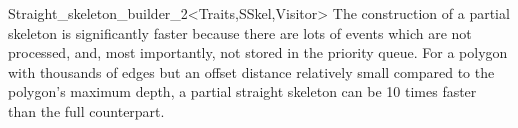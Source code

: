 \begin{ccRefClass}{Straight_skeleton_builder_2<Traits,SSkel,Visitor>}
The construction of a partial skeleton is significantly faster because there are lots of events which are not processed, and, most importantly, not stored in the priority queue.
For a polygon with thousands of edges but an offset distance relatively small compared to the polygon's maximum depth, a partial straight skeleton can be 10 times faster\\
than the full counterpart.



\ccSeeAlso
{}\\
\\
\\
\\
\\
\\
\\
\\
\end{ccRefClass}

